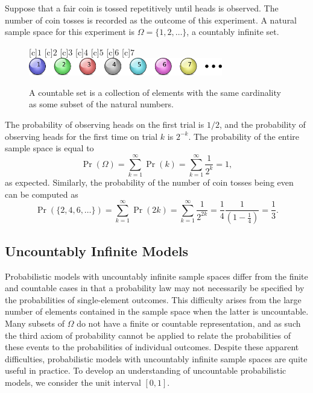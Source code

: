 \begin{example} \label{example:CoinTossSequence}
Suppose that a fair coin is tossed repetitively until heads is observed.
The number of coin tosses is recorded as the outcome of this experiment.
A natural sample space for this experiment is $\Omega = \{ 1, 2, \ldots \}$, a countably infinite set.

\begin{figure}[htb!]
\begin{center}
\begin{psfrags}
[c]{$1$}
[c]{$2$}
[c]{$3$}
[c]{$4$}
[c]{$5$}
[c]{$6$}
[c]{$7$}
\includegraphics[height=0.765cm]{Figures/2Chapter/countablespace}
\end{psfrags}
\caption{A countable set is a collection of elements with the same cardinality as some subset of the natural numbers.}
\end{center}
\end{figure}

The probability of observing heads on the first trial is $1/2$, and the probability of observing heads for the first time on trial $k$ is $2^{-k}$.
The probability of the entire sample space is equal to
\begin{equation*}
\Pr ( \Omega ) = \sum_{k=1}^{\infty} \Pr (k)
= \sum_{k=1}^{\infty} \frac{1}{2^k} = 1 ,
\end{equation*}
as expected.
Similarly, the probability of the number of coin tosses being even can be computed as
\begin{equation*}
\Pr ( \{ 2, 4, 6, \ldots \} )
= \sum_{k=1}^{\infty} \Pr (2k)
= \sum_{k = 1}^{\infty} \frac{1}{2^{2k}}
= \frac{1}{4} \frac{1}{ \left( 1 - \frac{1}{4} \right) }
= \frac{1}{3} .
\end{equation*}
\end{example}


\subsection{Uncountably Infinite Models}

Probabilistic models with uncountably infinite sample spaces differ from the finite and countable cases in that a probability law may not necessarily be specified by the probabilities of single-element outcomes.
This difficulty arises from the large number of elements contained in the sample space when the latter is uncountable.
Many subsets of $\Omega$ do not have a finite or countable representation, and as such the third axiom of probability cannot be applied to relate the probabilities of these events to the probabilities of individual outcomes.
Despite these apparent difficulties, probabilistic models with uncountably infinite sample spaces are quite useful in practice.
To develop an understanding of uncountable probabilistic models, we consider the unit interval $[0, 1]$.

